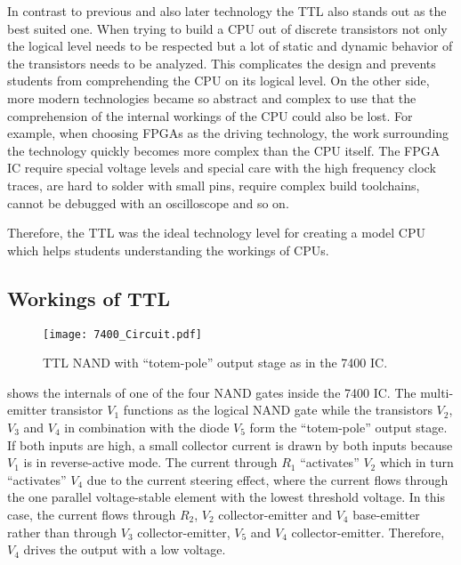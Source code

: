 In contrast to previous and also later technology the \gls{TTL} also stands out as the best suited one.
When trying to build a \gls{CPU} out of discrete transistors not only the logical level needs to be respected but a lot of static and dynamic behavior of the transistors needs to be analyzed.
This complicates the design and prevents students from comprehending the \gls{CPU} on its logical level.
On the other side, more modern technologies became so abstract and complex to use that the comprehension of the internal workings of the \gls{CPU} could also be lost.
For example, when choosing \glspl{FPGA} as the driving technology, the work surrounding the technology quickly becomes more complex than the \gls{CPU} itself.
The \gls{FPGA} \gls{IC} require special voltage levels and special care with the high frequency clock traces, are hard to solder with small pins, require complex build toolchains, cannot be debugged with an oscilloscope and so on.

Therefore, the \gls{TTL} was the ideal technology level for creating a model \gls{CPU} which helps students understanding the workings of \glspl{CPU}.

\subsection{Workings of \gls{TTL}}\label{sec:ttl}
\begin{figure}[t]
  \centering
  \texttt{[image: 7400\_Circuit.pdf]}
  \caption{\gls{TTL} NAND with ``totem-pole'' output stage as in the 7400 \gls{IC}. \cite{7400_Circuit}}
  \label{fig:7400_Circuit}
\end{figure}

 shows the internals of one of the four NAND gates inside the 7400 \gls{IC}.
The multi-emitter transistor $V_1$ functions as the logical NAND gate while the transistors $V_2$, $V_3$ and $V_4$ in combination with the diode $V_5$ form the ``totem-pole'' output stage.
If both inputs are high, a small collector current is drawn by both inputs because $V_1$ is in reverse-active mode.
The current through $R_1$ ``activates'' $V_2$ which in turn ``activates'' $V_4$ due to the current steering effect, where the current flows through the one parallel voltage-stable element with the lowest threshold voltage.
In this case, the current flows through $R_2$, $V_2$ collector-emitter and $V_4$ base-emitter rather than through $V_3$ collector-emitter, $V_5$ and $V_4$ collector-emitter.
Therefore, $V_4$ drives the output with a low voltage.

